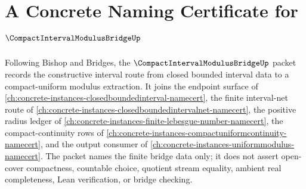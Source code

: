 \chapter{A Concrete Naming Certificate for $\CompactIntervalModulusBridgeUp$}
\label{ch:concrete-instances-compact-interval-modulus-bridge-namecert}

Following Bishop and Bridges, the $\CompactIntervalModulusBridgeUp$ packet records the constructive interval route from closed bounded interval data to a compact-uniform modulus extraction. It joins the endpoint surface of \autoref{ch:concrete-instances-closedboundedinterval-namecert}, the finite interval-net route of \autoref{ch:concrete-instances-closedboundedintervalnet-namecert}, the positive radius ledger of \autoref{ch:concrete-instances-finite-lebesgue-number-namecert}, the compact-continuity rows of \autoref{ch:concrete-instances-compactuniformcontinuity-namecert}, and the output consumer of \autoref{ch:concrete-instances-uniformmodulus-namecert}. The packet names the finite bridge data only; it does not assert open-cover compactness, countable choice, quotient stream equality, ambient real completeness, Lean verification, or bridge checking.

